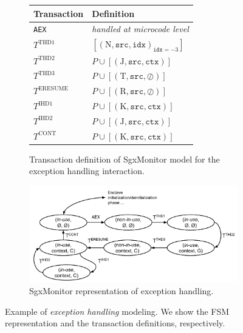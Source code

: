\begin{figure}[t]
\centering
\begin{subfigure}[b]{0.43\textwidth}
	\centering
	\begin{tabular}{ll}
		\toprule 
		\textbf{Transaction} & \textbf{Definition} \\ \midrule		
		\texttt{AEX} & \emph{handled at microcode level} \\
		$T^\text{THD1}$ & $[(\text{N}, \texttt{src}, 
		\texttt{idx})_{\texttt{idx} = -3}]$ \\
		$T^\text{THD2}$ & $P \cup [(\text{J}, \texttt{src}, \texttt{ctx})]$ \\
		$T^\text{THD3}$ & $P \cup [(\text{T}, \texttt{src}, \oslash)]$ \\
		$T^\text{ERESUME}$ & $P \cup [(\text{R}, \texttt{src}, \oslash)]$ \\
		$T^\text{IHD1}$ & $P \cup [(\text{K}, \texttt{src}, \texttt{ctx})]$ \\
		$T^\text{IHD2}$ & $P \cup [(\text{J}, \texttt{src}, \texttt{ctx})]$ \\
		$T^\text{CONT}$ & $P \cup [(\text{K}, \texttt{src}, \texttt{ctx})]$ 
		\\		
		\bottomrule
	\end{tabular} 
	\caption{Transaction definition of SgxMonitor model for the exception 
		handling interaction.}
	\label{tbl:transactions-exception}
\end{subfigure}
\hfill
\begin{subfigure}[b]{0.5\textwidth}
	\centering
	\includegraphics[width=\linewidth]{fig_c6/my-model-exception.pdf}
	\caption{SgxMonitor representation of exception handling.}
	\label{fig:my-model-exception}
\end{subfigure}
\caption[SGX \emph{exception handling} modeling.]{Example of \emph{exception 
handling} modeling. We show the FSM representation and the transaction 
definitions, respectively.}
\label{fig:exception-handling}
\end{figure}

